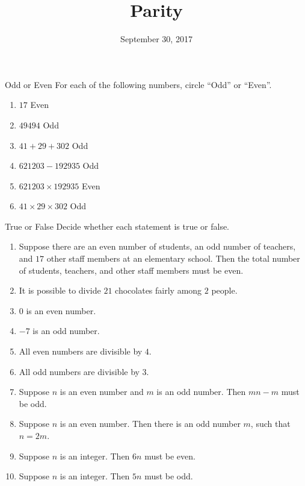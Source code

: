 \documentclass[12pt,letterpaper]{article}
\title{Parity}
\date{September 30, 2017}
\begin{document}
\maketitle

\thispagestyle{empty}

\begin{problem}{Odd or Even}
For each of the following numbers, circle ``Odd'' or ``Even''.
\begin{enumerate}
 \item $17$ \hfill {} \hspace{1em} Even
 \item $49494$ \hfill Odd \hspace{1em} 
 \item $41 + 29 + 302$ \hfill Odd \hspace{1em} 
 \item $621203 - 192935$ \hfill Odd \hspace{1em} 
 \item $621203 \times 192935$ \hfill {} \hspace{1em} Even
 \item $41 \times 29 \times 302$ \hfill Odd \hspace{1em} 
\end{enumerate}
\end{problem}

\begin{problem}{True or False}
  Decide whether each statement is true or false.

  \begin{enumerate}
    \item Suppose there are an even number of students, an odd number of
    teachers, and $17$ other staff members at an elementary school. Then the
    total number of students, teachers, and other staff members must be even.
    \hfill \TFTrue
    \item It is possible to divide \(21\) chocolates fairly among \(2\) people.
    \hfill \TFFalse
    \item \(0\) is an even number. \hfill \TFTrue
    \item \(-7\) is an odd number. \hfill \TFTrue
    \item All even numbers are divisible by \(4\). \hfill \TFFalse
    \item All odd numbers are divisible by \(3\). \hfill \TFFalse
    \item Suppose \(n\) is an even number and \(m\) is an odd number. Then \(mn -
    m\) must be odd. \hfill \TFTrue
    \item Suppose \(n\) is an even number. Then there is an odd number \(m\),
    such that \(n = 2m\). \hfill \TFFalse
    \item Suppose \(n\) is an integer. Then \(6n\) must be even. \hfill \TFTrue
    \item Suppose \(n\) is an integer. Then \(5n\) must be odd. \hfill \TFFalse
  \end{enumerate}
\end{problem}
\end{document}
